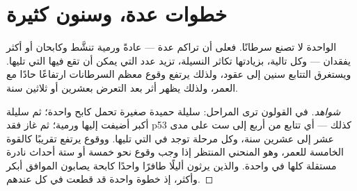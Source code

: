 \section{خطوات عدة، وسنون كثيرة}

\begin{proposition}\label{prop:g11:cancer:multistep}
 الواحدة لا تصنع سرطانًا. فعلى  أن تراكم عدة  ---
عادةً  ورمية تنشَّط وكابحان أو أكثر يفقدان --- وكل  تالية،
بزيادتها تكاثر النسيلة، تزيد عدد  التي يمكن أن تقع فيها التي
تليها. ويستغرق التتابع سنين إلى عقود، ولذلك يرتفع وقوع معظم السرطانات
ارتفاعًا حادًا مع العمر، ولذلك يظهر أثر  بعد التعرض بعشرين أو
ثلاثين سنة.
\end{proposition}
\begin{proof}[شواهد]
في القولون ترى المراحل: سليلة حميدة صغيرة تحمل  كابح واحدة؛ ثم
سليلة أكبر أضيفت إليها  ورمية؛ ثم  غاز فقد p53 كذلك --- أي
تتابع من أربع إلى ست  على مدى عشر إلى عشرين سنة، وكل مرحلة توجد
في  التي تليها. ووقوع  يرتفع تقريبًا كالقوة الخامسة للعمر،
وهو المنحني المنتظر إذا وجب وقوع نحو خمسة أو ستة أحداث نادرة مستقلة
كلها في  واحدة. والذين يرثون أليلًا طافرًا واحدًا  كابحة
يصابون  الموافق أبكر وأكثر، إذ خطوة واحدة قد قطعت في كل 
عندهم.
\end{proof}

